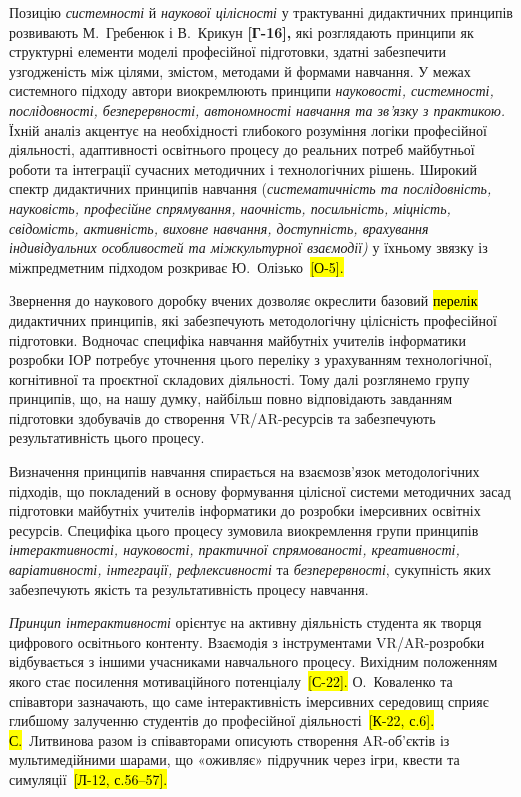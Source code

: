 Позицію \emph{системності} й \emph{наукової цілісності} у трактуванні дидактичних принципів розвивають М.~Гребенюк і В.~Крикун \textbf{{[}Г-16{]},} які розглядають принципи як структурні елементи моделі професійної підготовки, здатні забезпечити узгодженість між цілями, змістом, методами й формами навчання. У межах системного підходу автори виокремлюють принципи \emph{науковості, системності, послідовності, безперервності, автономності навчання та зв'язку з практикою.} Їхній аналіз акцентує на необхідності глибокого розуміння логіки професійної діяльності, адаптивності освітнього процесу до реальних потреб майбутньої роботи та інтеграції сучасних методичних і технологічних рішень. Широкий спектр дидактичних принципів навчання (\emph{систематичність та послідовність, науковість, професійне спрямування, наочність, посильність, міцність, свідомість, активність, виховне навчання, доступність, врахування індивідуальних особливостей та міжкультурної взаємодії)} у їхньому зв\textquotesingle язку із міжпредметним підходом розкриває Ю.~Олізько~\hl{{[}О-5{]}.}

Звернення до наукового доробку вчених дозволяє окреслити базовий \hl{перелік} дидактичних принципів, які забезпечують методологічну цілісність професійної підготовки. Водночас специфіка навчання майбутніх учителів інформатики розробки ІОР потребує уточнення цього переліку з урахуванням технологічної, когнітивної та проєктної складових діяльності. Тому далі розглянемо групу принципів, що, на нашу думку, найбільш повно відповідають завданням підготовки здобувачів до створення VR/AR-ресурсів та забезпечують результативність цього процесу.

Визначення принципів навчання спирається на взаємозв'язок методологічних підходів, що покладений в основу формування цілісної системи методичних засад підготовки майбутніх учителів інформатики до розробки імерсивних освітніх ресурсів. Специфіка цього процесу зумовила виокремлення групи принципів \emph{інтерактивності, науковості, практичної спрямованості, креативності, варіативності, інтеграції, рефлексивності} та \emph{безперервності}, сукупність яких забезпечують якість та результативність процесу навчання.

\emph{Принцип інтерактивності} орієнтує на активну діяльність студента як творця цифрового освітнього контенту. Взаємодія з інструментами VR/AR-розробки відбувається з іншими учасниками навчального процесу. Вихідним положенням якого стає посилення мотиваційного потенціалу~\hl{{[}С-22{]}.} О.~Коваленко та співавтори зазначають, що саме інтерактивність імерсивних середовищ сприяє глибшому залученню студентів до професійної діяльності~\hl{{[}К-22, с.6{]}. С.}~Литвинова разом із співавторами описують створення AR-об'єктів із мультимедійними шарами, що «оживляє» підручник через ігри, квести та симуляції~\hl{{[}Л-12, с.56--57{]}.}

